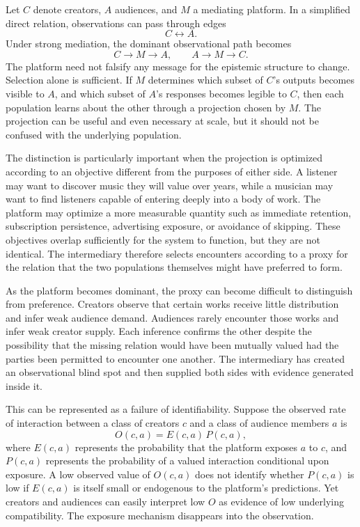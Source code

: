 \documentclass[11pt]{article}
\begin{document}
Let \(C\) denote creators, \(A\) audiences, and \(M\) a mediating platform. In a simplified direct relation, observations can pass through edges
\[
C \leftrightarrow A.
\]
Under strong mediation, the dominant observational path becomes
\[
C \longrightarrow M \longrightarrow A,
\qquad
A \longrightarrow M \longrightarrow C.
\]
The platform need not falsify any message for the epistemic structure to change. Selection alone is sufficient. If \(M\) determines which subset of \(C\)'s outputs becomes visible to \(A\), and which subset of \(A\)'s responses becomes legible to \(C\), then each population learns about the other through a projection chosen by \(M\). The projection can be useful and even necessary at scale, but it should not be confused with the underlying population.

The distinction is particularly important when the projection is optimized according to an objective different from the purposes of either side. A listener may want to discover music they will value over years, while a musician may want to find listeners capable of entering deeply into a body of work. The platform may optimize a more measurable quantity such as immediate retention, subscription persistence, advertising exposure, or avoidance of skipping. These objectives overlap sufficiently for the system to function, but they are not identical. The intermediary therefore selects encounters according to a proxy for the relation that the two populations themselves might have preferred to form.

As the platform becomes dominant, the proxy can become difficult to distinguish from preference. Creators observe that certain works receive little distribution and infer weak audience demand. Audiences rarely encounter those works and infer weak creator supply. Each inference confirms the other despite the possibility that the missing relation would have been mutually valued had the parties been permitted to encounter one another. The intermediary has created an observational blind spot and then supplied both sides with evidence generated inside it.

This can be represented as a failure of identifiability. Suppose the observed rate of interaction between a class of creators \(c\) and a class of audience members \(a\) is
\[
O(c,a)
=
E(c,a)\,P(c,a),
\]
where \(E(c,a)\) represents the probability that the platform exposes \(a\) to \(c\), and \(P(c,a)\) represents the probability of a valued interaction conditional upon exposure. A low observed value of \(O(c,a)\) does not identify whether \(P(c,a)\) is low if \(E(c,a)\) is itself small or endogenous to the platform's predictions. Yet creators and audiences can easily interpret low \(O\) as evidence of low underlying compatibility. The exposure mechanism disappears into the observation.
\end{document}
